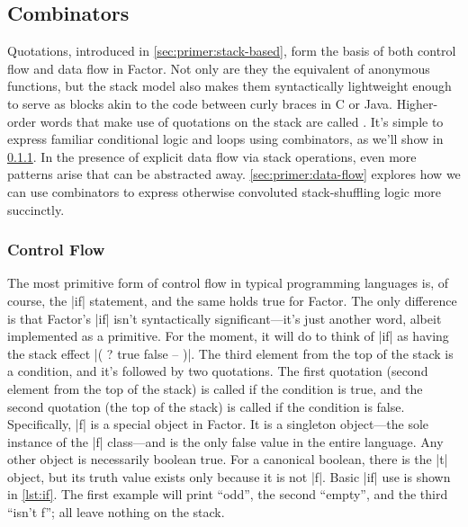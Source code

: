 \subsection{Combinators}\label{sec:primer:combinators}

Quotations, introduced in \cref{sec:primer:stack-based}, form the basis of both
control flow and data flow in Factor.  Not only are they the equivalent of
anonymous functions, but the stack model also makes them syntactically
lightweight enough to serve as blocks akin to the code between curly braces in
C or Java.  Higher-order words that make use of quotations on the stack are
called .  It's simple to express familiar conditional logic
and loops using combinators, as we'll show in \cref{sec:primer:control-flow}.
In the presence of explicit data flow via stack operations, even more patterns
arise that can be abstracted away.  \cref{sec:primer:data-flow} explores how we
can use combinators to express otherwise convoluted stack-shuffling logic more
succinctly.

\subsubsection{Control Flow}\label{sec:primer:control-flow}


The most primitive form of control flow in typical programming languages is, of
course, the |if| statement, and the same holds true for Factor.  The
only difference is that Factor's \factor|if| isn't syntactically
significant---it's just another word, albeit implemented as a primitive.  For
the moment, it will do to think of \factor|if| as having the stack effect
%
\factor|( ? true false -- )|.
%
The third element from the top of the stack is a condition, and it's followed
by two quotations.  The first quotation (second element from the top of the
stack) is called if the condition is true, and the second quotation (the top of
the stack) is called if the condition is false.  Specifically, \factor|f| is a
special object in Factor.  It is a singleton object---the sole instance of the
\factor|f| class---and is the only false value in the entire language.  Any
other object is necessarily boolean true.  For a canonical boolean, there is
the \factor|t| object, but its truth value exists only because it is not
\factor|f|.  Basic \factor|if| use is shown in \cref{lst:if}.  The first
example will print ``odd'', the second ``empty'', and the third ``isn't f'';
all leave nothing on the stack.

